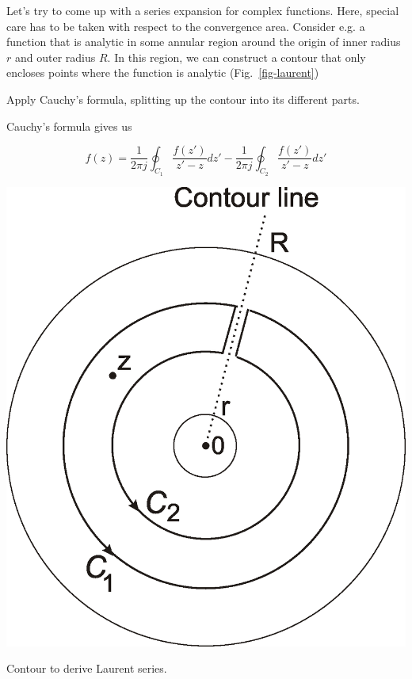 Let's try to come up with a series expansion for complex functions. Here, special care has to be taken with respect to the convergence area. Consider e.g. a function that is analytic in some annular region around the origin of inner radius $r$ and outer radius $R$. In this region, we can construct a contour that only encloses points where the function is analytic (Fig.~\ref{fig-laurent})

\begin{cue}
  Apply Cauchy's formula, splitting up the contour into its different parts.
\end{cue}

Cauchy's formula gives us

\begin{equation}
f(z)=\frac{1}{2 \pi j }\oint_{{C}_1} \frac{f(z')} {z'-z} dz' -\frac{1}{2
\pi j }\oint_{{C}_2} \frac{f(z')} {z'-z} dz' \label{laurent_0}
\end{equation} 

\begin{marginfigure}
\includegraphics{complex/figures/laurent}
\caption{Contour to derive Laurent series.}
\label{fig-laurent}
\end{marginfigure}

